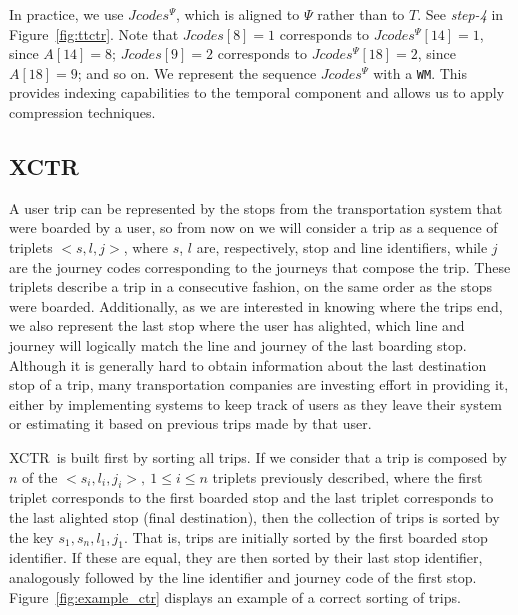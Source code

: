 \documentclass[runningheads]{llncs}
\newcommand{\ctr}{XCTR}
\begin{document}
In practice, we use $Jcodes^{\Psi}$, which is aligned to $\Psi$ rather than to $T$. See {\em step-4} in Figure~\ref{fig:ttctr}. 
Note that $Jcodes[8]= 1$ corresponds to $Jcodes^{\Psi}[14]=1$, since $A[14]=8$; 
          $Jcodes[9]= 2$ corresponds to $Jcodes^{\Psi}[18]=2$, since $A[18]=9$; and so on.
We represent the sequence $Jcodes^{\Psi}$ with a \texttt{WM}. This provides indexing capabilities to the temporal component and allows us to apply compression techniques.

\subsection{\ctr}
\label{sec:ctr}
A user trip can be represented by the stops from the transportation system that were boarded by a user, so from now on we will consider a trip as a sequence of triplets $<s,l,j>$, where $s$, $l$ are, respectively, stop and line identifiers, while $j$ are the journey codes corresponding to the journeys that compose the trip. These triplets describe a trip in a consecutive fashion, on the same order as the stops were boarded. Additionally, as we are interested in knowing where the trips end, we also represent the last stop where the user has alighted, which line and journey will logically match the line and journey of the last boarding stop. Although it is generally hard to obtain information about the last destination stop of a trip, many transportation companies are investing effort in providing it, either by implementing systems to keep track of users as they leave their system or estimating it based on previous trips made by that user.

\ctr~is built first by sorting all trips. If we consider that a trip is composed by $n$ of the $<s_i,l_i,j_i>,~1\leq i\leq n$ triplets previously described, where the first triplet corresponds to the first boarded stop and the last triplet corresponds to the last alighted stop (final destination), then the collection of trips is sorted by the key $s_1,s_n,l_1,j_1$. That is, trips are initially sorted by the first boarded stop identifier. If these are equal, they are then sorted by their last stop identifier, analogously followed by the line identifier and journey code of the first stop. Figure~\ref{fig:example_ctr} displays an example of a correct sorting of trips.
\end{document}

